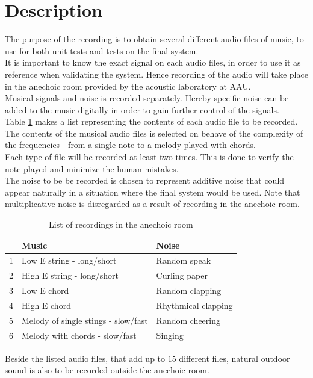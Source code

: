\section{Description}  
The purpose of the recording is to obtain several different audio files of music, to use for both unit tests and tests on the final system.\\
It is important to know the exact signal on each audio files, in order to use it as reference when validating the system. Hence recording of the audio will take place in the anechoic room provided by the acoustic laboratory at AAU. \\
Musical signals and noise is recorded separately. Hereby specific noise can be added to the music digitally in order to gain further control of the signals. \\
Table \ref{tab:audio} makes a list representing the contents of each audio file to   be recorded. The contents of the musical audio files is selected on behave of the complexity of the frequencies - from a single note to a melody played with chords.  \\
Each type of file will be recorded at least two times. This is done to verify the note played and minimize the human mistakes.    \\
The noise to be be recorded is chosen to represent additive noise that could appear naturally in a situation where the final system would be used. Note that multiplicative noise is disregarded as a result of recording in the anechoic room.         
\begin{table}[H]
\centering
\caption{List of recordings in the anechoic room}
\label{tab:audio}
\begin{tabular}{l|l|l}
\hline
  & \textbf{Music}                      & \textbf{Noise}     \\ \hline
1 & Low E string - long/short           & Random speak       \\ \hline
2 & High E string - long/short          & Curling paper      \\ \hline
3 & Low E chord                         & Random clapping    \\ \hline
4 & High E chord                        & Rhythmical clapping \\ \hline
5 & Melody of single stings - slow/fast & Random cheering    \\ \hline
6 & Melody with chords - slow/fast      & Singing            \\ \hline
\end{tabular}
\end{table}
Beside the listed audio files, that add up to $15$ different files, natural outdoor sound is also to be recorded outside the anechoic room. 

